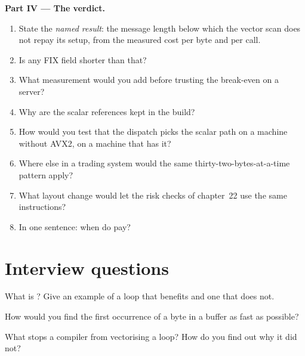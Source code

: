 \begin{problem}
\medskip\noindent\textbf{Part IV --- The verdict.}
\begin{enumerate}[resume]
\item State the \emph{named result}: the message length below which the vector scan does not repay its setup, from the
measured cost per byte and per call.
\item Is any FIX field shorter than that?
\item What measurement would you add before trusting the break-even on a server?
\item Why are the scalar references kept in the build?
\item How would you test that the dispatch picks the scalar path on a machine without AVX2, on a machine that has it?
\item Where else in a trading system would the same thirty-two-bytes-at-a-time pattern apply?
\item What layout change would let the risk checks of chapter~22 use the same instructions?
\item In one sentence: when do  pay?
\end{enumerate}
\end{problem}

\section{Interview questions}

\begin{interviewq}\label{iq:ll:vector-instructions-and-data-parallel-code:1}
What is ? Give an example of a loop that benefits and one that does not.
\end{interviewq}

\begin{interviewq}\label{iq:ll:vector-instructions-and-data-parallel-code:2}
How would you find the first occurrence of a byte in a buffer as fast as possible?
\end{interviewq}

\begin{interviewq}\label{iq:ll:vector-instructions-and-data-parallel-code:3}
What stops a compiler from vectorising a loop? How do you find out why it did not?
\end{interviewq}

